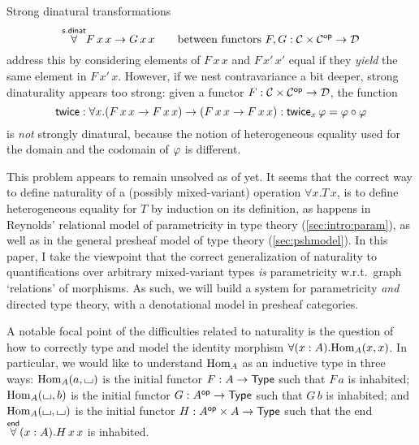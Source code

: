 \documentclass{lmcs} %
\theoremstyle{plain}\newtheorem{satz}[thm]{Satz} %
\theoremstyle{plain}
\theoremstyle{definition}
\begin{document}
Strong dinatural transformations
\[
	\overset{\mathsf{s.dinat}}{\forall} F\,x\,x \to G\,x\,x \qquad \text{between functors $F, G : {\mathcal{C}} \times {\mathcal{C}}^{\mathsf{op}} \to {\mathcal{D}}$}
\]
address this by considering elements of $F\,x\,x$ and $F\,x'\,x'$ equal if they \emph{yield} the same element in $F\,x'\,x$.
However, if we nest contravariance a bit deeper, strong dinaturality appears too strong: given a functor $F : {\mathcal{C}} \times {\mathcal{C}}^{\mathsf{op}} \to {\mathcal{D}}$, the function
\[
	\mathsf{twice} : \forall x . (F\,x\,x \to F\,x\,x) \to (F\,x\,x \to F\,x\,x) : \mathsf{twice}_x\,\varphi = \varphi \circ \varphi
\]
is \emph{not} strongly dinatural, because the notion of heterogeneous equality used for the domain and the codomain of $\varphi$ is different.

This problem appears to remain unsolved as of yet.
It seems that the correct way to define naturality of a (possibly mixed-variant) operation $\forall x.T\,x$, is to define heterogeneous equality for $T$ by induction on its definition, as happens in Reynolds' relational model of parametricity in type theory \cite{reynolds} (\cref{sec:intro:param}), as well as in the general presheaf model of type theory \cite[ch.\ 4]{Hofmann97} (\cref{sec:pshmodel}).
In this paper, I take the viewpoint that the correct generalization of naturality to quantifications over arbitrary mixed-variant types \emph{is} parametricity w.r.t.\ graph `relations' of morphisms.
As such, we will build a system for parametricity \emph{and} directed type theory, with a denotational model in presheaf categories.

A notable focal point of the difficulties related to naturality is the question of how to correctly type and model the identity morphism $\forall(x : A).{\mathrm{Hom}}_A(x, x)$.
In particular, we would like to understand ${\mathrm{Hom}}_A$ as an inductive type in three ways: ${\mathrm{Hom}}_A(a, {\llcorner\hspace{-.4ex}\lrcorner})$ is the initial functor $F : A \to {\mathsf{Type}}$ such that $F\,a$ is inhabited; ${\mathrm{Hom}}_A({\llcorner\hspace{-.4ex}\lrcorner}, b)$ is the initial functor $G : A^{\mathsf{op}} \to {\mathsf{Type}}$ such that $G\,b$ is inhabited; and ${\mathrm{Hom}}_A({\llcorner\hspace{-.4ex}\lrcorner}, {\llcorner\hspace{-.4ex}\lrcorner})$ is the initial functor $H : A^{\mathsf{op}} \times A \to {\mathsf{Type}}$ such that the end $\overset{\mathsf{end}}{\forall}(x : A).H\,x\,x$ is inhabited.

\end{document}
